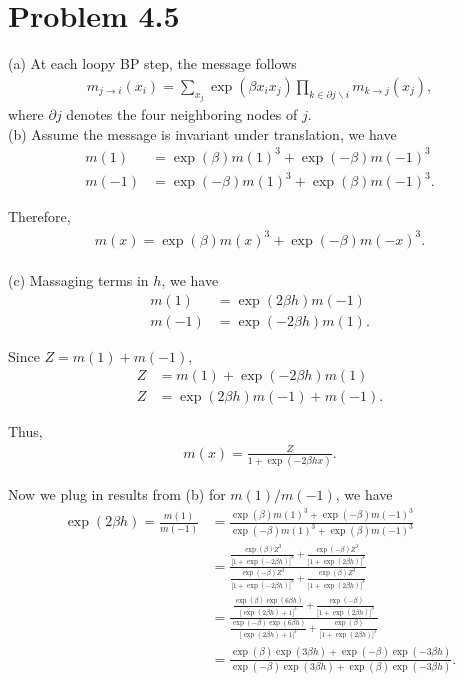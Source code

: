 \documentclass{article}
\begin{document}
\pagebreak

\pagebreak
\section*{Problem 4.5}
%
(a) At each loopy BP step, the message follows
\begin{align*}
	m_{j\to i}(x_i) = \sum_{x_j}\exp(\beta x_i x_j)\prod_{k\in \partial j \backslash i} m_{k\to j}(x_j),
\end{align*}
where $\partial j$ denotes the four neighboring nodes of $j$.
\\

\noindent
(b) Assume the message is invariant under translation, we have
\begin{align*}
	m(1) &= \exp(\beta)m(1)^3 + \exp(-\beta)m(-1)^3\\
	m(-1) &= \exp(-\beta)m(1)^3 + \exp(\beta)m(-1)^3.
\end{align*}
%

Therefore, 
\begin{align}
	m(x) = \exp(\beta)m(x)^3 + \exp(-\beta)m(-x)^3. \label{eq:5b}
\end{align}
\\

\noindent
(c) Massaging terms in $h$, we have
\begin{align*}
	m(1) &= \exp(2\beta h)m(-1)\\
	m(-1) &= \exp(-2\beta h)m(1).
\end{align*}
%

Since $Z = m(1) + m(-1)$,
\begin{align*}
	Z &= m(1) + \exp(-2\beta h)m(1)\\
	Z &= \exp(2\beta h)m(-1) + m(-1).
\end{align*}
%

Thus,
\begin{align}
	m(x) = \frac{Z}{1 + \exp(-2\beta h x)}. \label{eq:5c}
\end{align}
%

Now we plug in results from (b) for $m(1) / m(-1)$, we have
\begin{align*}
	\exp(2\beta h) = \frac{m(1)}{m(-1)} &=
	\frac{\exp(\beta)m(1)^3 + \exp(-\beta)m(-1)^3}{\exp(-\beta)m(1)^3 + \exp(\beta)m(-1)^3} \\
	&=\frac{\frac{\exp(\beta)Z^3}{\big[1 + \exp(-2\beta h)\big]^3} +
	  \frac{\exp(-\beta)Z^3}{\big[1 + \exp(2\beta h)\big]^3}}
	  {\frac{\exp(-\beta)Z^3}{\big[1 + \exp(-2\beta h)\big]^3} + 
	  \frac{\exp(\beta)Z^3}{\big[1 + \exp(2\beta h)\big]^3}}\\
	&=\frac{\frac{\exp(\beta)\exp(6\beta h)}{\big[\exp(2\beta h) + 1\big]^3} +
	  \frac{\exp(-\beta)}{\big[1 + \exp(2\beta h)\big]^3}}
	  {\frac{\exp(-\beta)\exp(6\beta h)}{\big[\exp(2\beta h) + 1\big]^3} + 
	  \frac{\exp(\beta)}{\big[1 + \exp(2\beta h)\big]^3}}\\
	&=\frac{\exp(\beta)\exp(3\beta h) +
	        \exp(-\beta)\exp(-3\beta h)}
	       {\exp(-\beta)\exp(3\beta h) +
	        \exp(\beta)\exp(-3\beta h)}.
\end{align*}
%
\end{document}

